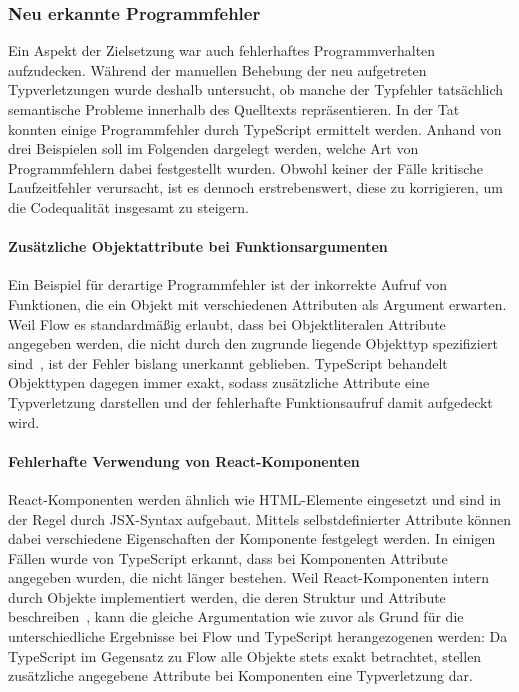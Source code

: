 \subsubsection{Neu erkannte Programmfehler}

Ein Aspekt der Zielsetzung war auch fehlerhaftes Programmverhalten aufzudecken. Während der manuellen Behebung der neu aufgetreten Typverletzungen wurde deshalb untersucht, ob manche der Typfehler tatsächlich semantische Probleme innerhalb des Quelltexts repräsentieren. In der Tat konnten einige Programmfehler durch TypeScript ermittelt werden. Anhand von drei Beispielen soll im Folgenden dargelegt werden, welche Art von Programmfehlern dabei festgestellt wurden. Obwohl keiner der Fälle kritische Laufzeitfehler verursacht, ist es dennoch erstrebenswert, diese zu korrigieren, um die Codequalität insgesamt zu steigern.

\vspace{-0.5\baselineskip}
\paragraph{Zusätzliche Objektattribute bei Funktionsargumenten}
Ein Beispiel für derartige Programmfehler ist der inkorrekte Aufruf von Funktionen, die ein Objekt mit verschiedenen Attributen als Argument erwarten. Weil Flow es standardmäßig erlaubt, dass bei Objektliteralen Attribute angegeben werden, die nicht durch den zugrunde liegende Objekttyp spezifiziert sind~\autocite{FLOW:WIDTH_SUBTYPING}, ist der Fehler bislang unerkannt geblieben. TypeScript behandelt Objekttypen dagegen immer exakt, sodass zusätzliche Attribute eine Typverletzung darstellen und der fehlerhafte Funktionsaufruf damit aufgedeckt wird.

\vspace{-0.5\baselineskip}
\paragraph{Fehlerhafte Verwendung von React-Komponenten}
React-Komponenten werden ähnlich wie HTML-Elemente eingesetzt und sind in der Regel durch JSX-Syntax aufgebaut. Mittels selbstdefinierter Attribute können dabei verschiedene Eigenschaften der Komponente festgelegt werden. In einigen Fällen wurde von TypeScript erkannt, dass bei Komponenten Attribute angegeben wurden, die nicht länger bestehen. Weil React-Komponenten intern durch Objekte implementiert werden, die deren Struktur und Attribute beschreiben~\autocite{REACT:REACT_ELEMENTS}, kann die gleiche Argumentation wie zuvor als Grund für die unterschiedliche Ergebnisse bei Flow und TypeScript herangezogenen werden: Da TypeScript im Gegensatz zu Flow alle Objekte stets exakt betrachtet, stellen zusätzliche angegebene Attribute bei Komponenten eine Typverletzung dar.

